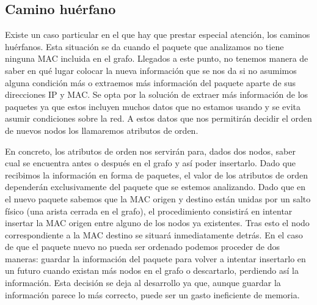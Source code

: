 \documentclass[twoside, 12pt]{epstfg}
\begin{document}

%

\subsection{Camino huérfano}
\label{subsec:Analisis:Reconstruccion:Huerfano}

Existe un caso particular en el que hay que prestar especial atención, los caminos huérfanos. Esta situación se da cuando el paquete que analizamos no tiene ninguna MAC incluida en el grafo. Llegados a este punto, no tenemos manera de saber en qué lugar colocar la nueva información que se nos da si no asumimos alguna condición más o extraemos más información del paquete aparte de sus direcciones IP y MAC. Se opta por la solución de extraer más información de los paquetes ya que estos incluyen muchos datos que no estamos usando y se evita asumir condiciones sobre la red. A estos datos que nos permitirán decidir el orden de nuevos nodos los llamaremos atributos de orden.

En concreto, los atributos de orden nos servirán para, dados dos nodos, saber cual se encuentra antes o después en el grafo y así poder insertarlo. Dado que recibimos la información en forma de paquetes, el valor de los atributos de orden dependerán exclusivamente del paquete que se estemos analizando. Dado que en el nuevo paquete sabemos que la MAC origen y destino están unidas por un salto físico (una arista cerrada en el grafo), el procedimiento consistirá en intentar insertar la MAC origen entre alguno de los nodos ya existentes. Tras esto el nodo correspondiente a la MAC destino se situará inmediatamente detrás. En el caso de que el paquete nuevo no pueda ser ordenado podemos proceder de dos maneras: guardar la información del paquete para volver a intentar insertarlo en un futuro cuando existan más nodos en el grafo o descartarlo, perdiendo así la información. Esta decisión se deja al desarrollo ya que, aunque guardar la información parece lo más correcto, puede ser un gasto ineficiente de memoria.
\end{document}
